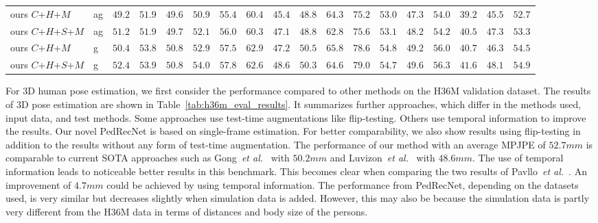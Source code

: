 \documentclass[a4paper, 10pt, conference]{ieeeconf}
\begin{document}
\begin{table*}[!htp]
{\begin{tabular}{l l l l l l l l l l l l l l l l l l}
    \midrule
    ours $C$+$H$+$M$ & ag & $49.2$ & $51.9$ & $49.6$ & $50.9$ & $55.4$ & $60.4$ & $45.4$ & $48.8$ & $64.3$ & $75.2$ & $53.0$ & $47.3$ & $54.0$ & $39.2$ & $45.5$ & $\mathbf{52.7}$ \\
    ours $C$+$H$+$S$+$M$ & ag & $51.2$ & $51.9$ & $49.7$ & $52.1$ & $56.0$ & $60.3$ & $47.1$ & $48.8$ & $62.8$ & $75.6$ & $53.1$ & $48.2$ & $54.2$ & $40.5$ & $47.3$ & $53.3$ \\
    \midrule
    ours $C$+$H$+$M$ & g & $50.4$ & $53.8$ & $50.8$ & $52.9$ & $57.5$ & $62.9$ & $47.2$ & $50.5$ & $65.8$ & $78.6$ & $54.8$ & $49.2$ & $56.0$ & $40.7$ & $46.3$ & $54.5$ \\
    ours $C$+$H$+$S$+$M$ & g & $52.4$ & $53.9$ & $50.8$ & $54.0$ & $57.8$ & $62.6$ & $48.6$ & $50.3$ & $64.6$ & $79.0$ & $54.7$ & $49.6$ & $56.3$ & $41.6$ & $48.1$ & $54.9$ \\
  \end{tabular}
  }
  \caption[H36M Results]{Results on the H36M dataset reported as mean per joint position error (MPJPE). Legend of properties (Prop.), influencing the results: (a) used test-time augmentation (in ours only flip test is applied), (g) used ground truth bounding boxes, (s) sampled every 64th frame of validation set, (t) used temporal information}
  \label{tab:h36m_eval_results}
\end{table*}

For 3D human pose estimation, we first consider the performance compared to other methods on the H36M validation dataset. The results of 3D pose estimation are shown in Table~\ref{tab:h36m_eval_results}. It summarizes further approaches, which differ in the methods used, input data, and test methods. Some approaches use test-time augmentations like flip-testing. Others use temporal information to improve the results. Our novel PedRecNet is based on single-frame estimation. For better comparability, we also show results using flip-testing in addition to the results without any form of test-time augmentation. The performance of our method with an average MPJPE of $52.7mm$ is comparable to current SOTA approaches such as Gong~\textit{et al.}~\cite{gongPoseAugDifferentiablePose2021} with $50.2mm$ and Luvizon~\textit{et al.}~\cite{luvizonMultitaskDeepLearning2020} with $48.6mm$. The use of temporal information leads to noticeable better results in this benchmark. This becomes clear when comparing the two results of Pavllo~\textit{et al.}~\cite{pavllo3DHumanPose2019}. An improvement of $4.7mm$ could be achieved by using temporal information. The performance from PedRecNet, depending on the datasets used, is very similar but decreases slightly when simulation data is added. However, this may also be because the simulation data is partly very different from the H36M data in terms of distances and body size of the persons.
\end{document}
